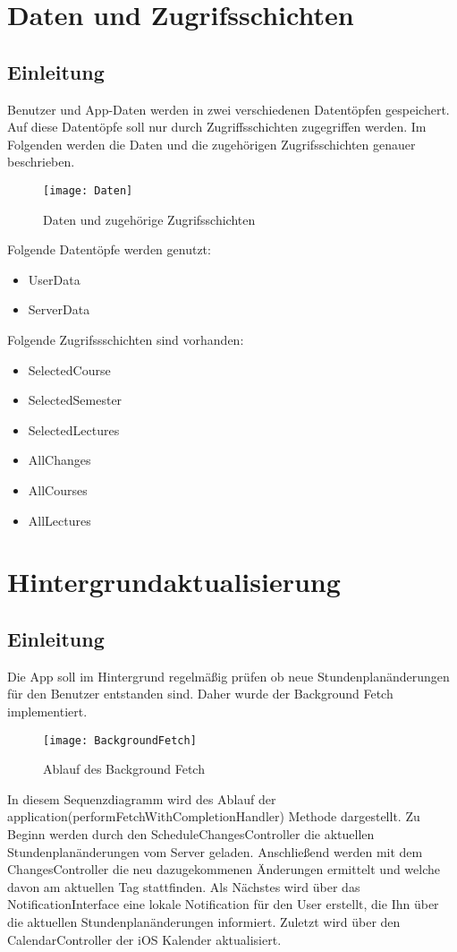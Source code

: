 \chapter{Daten und Zugrifsschichten}
\section{Einleitung}
Benutzer und App-Daten werden in zwei verschiedenen Datentöpfen gespeichert. Auf diese Datentöpfe soll nur durch Zugriffsschichten zugegriffen werden. Im Folgenden werden die Daten und die zugehörigen Zugrifsschichten genauer beschrieben.
\begin{figure}[htb]
    \centering
    \texttt{[image: Daten]}
    \caption{Daten und zugehörige Zugrifsschichten}
\end{figure}

Folgende Datentöpfe werden genutzt:
\begin{itemize}
     \item UserData
     \item ServerData
\end{itemize}

Folgende Zugrifssschichten sind vorhanden:
\begin{itemize}
     \item SelectedCourse
     \item SelectedSemester
     \item SelectedLectures
     \item AllChanges
     \item AllCourses
     \item AllLectures
\end{itemize}

\newpage
\chapter{Hintergrundaktualisierung}
\section{Einleitung}
Die App soll im Hintergrund regelmäßig prüfen ob neue Stundenplanänderungen für den Benutzer entstanden sind.
Daher wurde der Background Fetch implementiert.
\begin{figure}[htb]
    \centering
    \texttt{[image: BackgroundFetch]}
    \caption{Ablauf des Background Fetch}
\end{figure}

In diesem Sequenzdiagramm wird des Ablauf der application(performFetchWithCompletionHandler) Methode dargestellt. 
Zu Beginn werden durch den ScheduleChangesController die aktuellen Stundenplanänderungen vom Server geladen. 
Anschließend werden mit dem ChangesController die neu dazugekommenen Änderungen ermittelt und welche davon am aktuellen Tag stattfinden. Als Nächstes wird über das NotificationInterface eine lokale Notification für den User erstellt, die Ihn über die aktuellen Stundenplanänderungen informiert.
Zuletzt wird über den CalendarController der iOS Kalender aktualisiert.
\newpage

